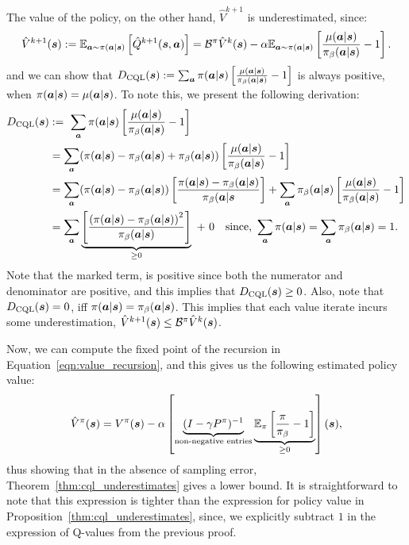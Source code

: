 The value of the policy, on the other hand, $\hat{V}^{k+1}$ is underestimated, since:
\begin{equation}
    \hat{V}^{k+1}(\boldsymbol{s}) := \mathbb{E}_{\boldsymbol{a} \sim \pi(\boldsymbol{a}|\boldsymbol{s})} \left[ \hat{Q}^{k+1}(\boldsymbol{s}, \boldsymbol{a}) \right] = \mathcal{B}^\pi \hat{V}^k (\boldsymbol{s}) - \alpha \mathbb{E}_{\boldsymbol{a} \sim \pi(\boldsymbol{a}|\boldsymbol{s})}\left[\frac{\mu(\boldsymbol{a}|\boldsymbol{s})}{{\pi_\beta}(\boldsymbol{a}|\boldsymbol{s})} - 1 \right].
    \label{eqn:value_recursion}
\end{equation}
and we can show that $D_{\text{CQL}}(\boldsymbol{s}): = \sum_{\boldsymbol{a}} \pi(\boldsymbol{a}|\boldsymbol{s}) \left[\frac{\mu(\boldsymbol{a}|\boldsymbol{s})}{{\pi_\beta}(\boldsymbol{a}|\boldsymbol{s})} - 1 \right]$ is always positive, when $\pi(\boldsymbol{a}|\boldsymbol{s}) = \mu(\boldsymbol{a}|\boldsymbol{s})$. To note this, we present the following derivation:
\begin{align*}
    D_{\text{CQL}}(\boldsymbol{s}) &:=~ \sum_{\boldsymbol{a}} \pi(\boldsymbol{a}|\boldsymbol{s}) \left[\frac{\mu(\boldsymbol{a}|\boldsymbol{s})}{{\pi_\beta}(\boldsymbol{a}|\boldsymbol{s})} - 1 \right]\\
    &= \sum_{\boldsymbol{a}} (\pi(\boldsymbol{a}|\boldsymbol{s}) - {\pi_\beta}(\boldsymbol{a}|\boldsymbol{s}) + {\pi_\beta}(\boldsymbol{a}|\boldsymbol{s})) \left[\frac{\mu(\boldsymbol{a}|\boldsymbol{s})}{{\pi_\beta}(\boldsymbol{a}|\boldsymbol{s})} - 1 \right]\\
    &= \sum_{\boldsymbol{a}} (\pi(\boldsymbol{a}|\boldsymbol{s}) - {\pi_\beta}(\boldsymbol{a}|\boldsymbol{s})) \left[ \frac{\pi(\boldsymbol{a}|\boldsymbol{s}) - {\pi_\beta}(\boldsymbol{a}|\boldsymbol{s})}{{\pi_\beta}(\boldsymbol{a}|\boldsymbol{s}} \right] + \sum_{\boldsymbol{a}} {\pi_\beta}(\boldsymbol{a}|\boldsymbol{s}) \left[\frac{\mu(\boldsymbol{a}|\boldsymbol{s})}{{\pi_\beta}(\boldsymbol{a}|\boldsymbol{s})} - 1 \right]\\
    &= \sum_{\boldsymbol{a}} \underbrace{\left[ \frac{\left(\pi(\boldsymbol{a}|\boldsymbol{s}) - {\pi_\beta}(\boldsymbol{a}|\boldsymbol{s}) \right)^2}{{\pi_\beta}(\boldsymbol{a}|\boldsymbol{s})} \right]}_{\geq 0}~ +~ 0 \text{~~~since,~} \sum_{\boldsymbol{a}} \pi(\boldsymbol{a}|\boldsymbol{s}) = \sum_{\boldsymbol{a}} {\pi_\beta}(\boldsymbol{a}|\boldsymbol{s}) = 1.
\end{align*}
Note that the marked term, is positive since both the numerator and denominator are positive, and this implies that $D_\text{CQL}(\boldsymbol{s}) \geq 0$. Also, note that $D_\text{CQL}(\boldsymbol{s}) = 0$, iff $\pi(\boldsymbol{a}|\boldsymbol{s}) = {\pi_\beta}(\boldsymbol{a}|\boldsymbol{s})$. This implies that each value iterate incurs some underestimation, $\hat{V}^{k+1}(\boldsymbol{s}) \leq \mathcal{B}^\pi \hat{V}^k (\boldsymbol{s})$.

Now, we can compute the fixed point of the recursion in Equation~\ref{eqn:value_recursion}, and this gives us the following estimated policy value:
\begin{equation*}
    \hat{V}^\pi(\boldsymbol{s}) = V^\pi(\boldsymbol{s}) - \alpha \left[ \underbrace{(I - \gamma P^\pi)^{-1}}_{\text{non-negative entries}}
    \underbrace{\mathbb{E}_{\pi}\left[\frac{\pi}{{\pi_\beta}} - 1 \right]}_{\geq 0} \right](\boldsymbol{s}),
\end{equation*}
thus showing that in the absence of sampling error, Theorem~\ref{thm:cql_underestimates} gives a lower bound. It is straightforward to note that this expression is tighter than the expression for policy value in Proposition~\ref{thm:cql_underestimates}, since, we explicitly subtract $1$ in the expression of Q-values from the previous proof.

